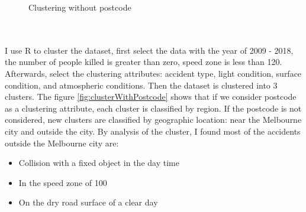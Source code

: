 \documentclass[10pt]{article}
\theoremstyle{definition}
\begin{document}
\begin{minipage}{\linewidth}
\begin{minipage}{0.49\linewidth}
\begin{figure}[H]
				{\caption{Clustering without postcode}}
			\label{fig:cluster3}
    \end{figure}
    \end{minipage}
\end{minipage}\\
\vspace{12pt}\\
I use R to cluster the dataset, first select the data with the year of 2009 - 2018, the number of people killed is greater than zero, speed zone is less than 120. Afterwards, select the clustering attributes: accident type, light condition, surface condition, and atmospheric conditions. Then the dataset is clustered into 3 clusters. The figure \ref{fig:clusterWithPostcode} shows that if we consider postcode as a clustering attribute, each cluster is classified by region. If the postcode is not considered, new clusters are classified by geographic location: near the Melbourne city and outside the city. By analysis of the cluster, I found most of the accidents outside the Melbourne city are: 
\begin{itemize}
	\item Collision with a fixed object in the day time
	\item In the speed zone of 100
	\item On the dry road surface of a clear day
\end{itemize}
\end{document}

